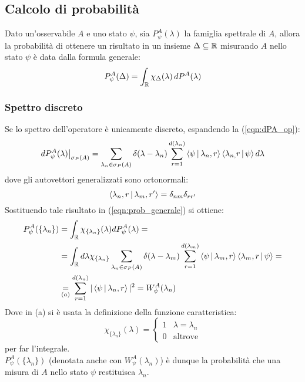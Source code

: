 \documentclass[../../FisicaTeorica.tex]{subfiles}
\begin{document}
\subsection{Calcolo di probabilità}
Dato un'osservabile $A$ e uno stato $\psi$, sia $P^A_\psi(\lambda)$ la famiglia spettrale di $A$, allora la probabilità di ottenere un risultato in un insieme $\Delta\subseteq \mathbb{R}$ misurando $A$ nello stato $\psi$ è data dalla formula generale:
\begin{equation}
P^A_\psi(\Delta) = \int_{\mathbb{R}} \chi_\Delta(\lambda)\,dP^A(\lambda)
\label{eqn:prob_generale}
\end{equation}
\subsubsection{Spettro discreto}
Se lo spettro dell'operatore è unicamente discreto, espandendo la (\ref{eqn:dPA_op}):
\[
dP^A_\psi(\lambda)\big|_{\sigma_P(A)}=\sum_{\lambda_n\in\sigma_P(A)}\delta(\lambda-\lambda_n)\sum_{r=1}^{d(\lambda_n)}\Braket{\psi|\lambda_{n},r}\Braket{\lambda_{n,}r|\psi}d\lambda
\]
dove gli autovettori generalizzati sono ortonormali:
\[
\Braket{\lambda_{n},r|\lambda_{m},r'}=\delta_{nm}\delta_{rr'}
\]
Sostituendo tale risultato in (\ref{eqn:prob_generale}) si ottiene:
\begin{align}
P_\psi^A(\{\lambda_n\})&=\int_{\mathbb{R}} \chi_{\{\lambda_n\}}(\lambda)dP_\psi^A(\lambda)=\nonumber \\
&=
\int_{\mathbb{R}} d\lambda \chi_{\{\lambda_n\}}\sum_{\lambda_n\in\sigma_P(A)}\delta(\lambda-\lambda_m)\sum_{r=1}^{d(\lambda_m)}\Braket{\psi|\lambda_{m},r}\Braket{\lambda_{m},r|\psi} =\nonumber \\
&\underset{(a)}{=} \sum_{r=1}^{d(\lambda_n)}|\Braket{\psi|\lambda_{n},r}|^2 = W^A_\psi(\lambda_n)
\label{eqn:probability_discreta}
\end{align}
Dove in (a) si è usata la definizione della funzione caratteristica:
\[
\chi_{\{\lambda_n\}}(\lambda)=
\begin{cases}
1 & \lambda=\lambda_n\\
0 & \text{altrove}
\end{cases}
\]
per far  l'integrale.\\
$P_\psi^A(\{\lambda_n\})$ (denotata anche con $W^A_\psi (\lambda_n)$) è dunque la probabilità che una misura di $A$ nello stato $\psi$ restituisca $\lambda_n$.\\
\end{document}
